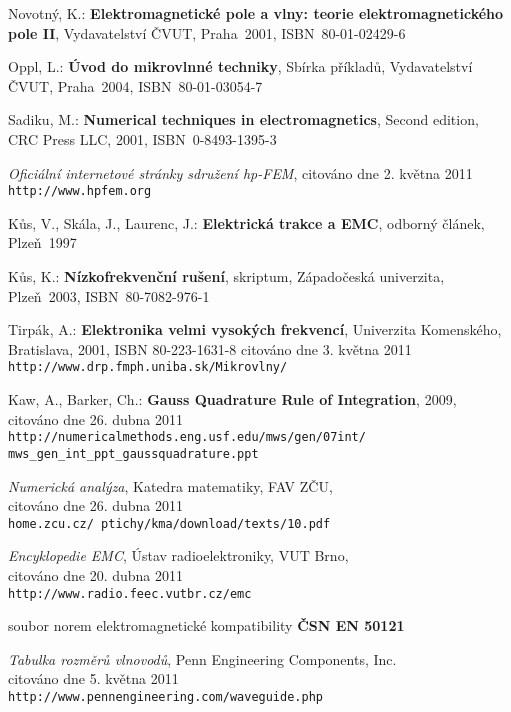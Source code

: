 
%


\begin{thebibliography}{9}
{\sc Novotný, K.:}  {\bf Elektromagnetické pole a vlny: teorie elektromagnetického pole II},
Vydavatelství ČVUT, Praha~2001, \mbox{ISBN 80-01-02429-6}

{\sc Oppl, L.:}  {\bf Úvod do mikrovlnné techniky},
Sbírka příkladů, Vydavatelství ČVUT, Praha~2004, \mbox{ISBN 80-01-03054-7}

{\sc Sadiku, M.:} {\bf Numerical techniques in electromagnetics},
Second edition, CRC Press LLC, 2001, \mbox{ISBN 0-8493-1395-3}

{\em Oficiální internetové stránky sdružení hp-FEM},
citováno dne 2. května 2011 \\
\texttt{http://www.hpfem.org}

{\sc Kůs, V., Skála, J., Laurenc, J.:}  {\bf Elektrická trakce a EMC},
odborný článek, Plzeň~1997

{\sc Kůs, K.:}  {\bf Nízkofrekvenční rušení},
skriptum, Západočeská univerzita, Plzeň~2003, \mbox{ISBN 80-7082-976-1}

{\sc Tirpák, A.:}  {\bf Elektronika velmi vysokých frekvencí}, Univerzita Komenského, Bratislava, 2001, ISBN 80-223-1631-8
citováno dne 3. května 2011 \\
\texttt{http://www.drp.fmph.uniba.sk/Mikrovlny/}

{\sc Kaw, A., Barker, Ch.:} {\bf Gauss Quadrature Rule of Integration}, 2009, \\
citováno dne 26. dubna 2011 \\
\texttt{http://numericalmethods.eng.usf.edu/mws/gen/07int/\\mws\_gen\_int\_ppt\_gaussquadrature.ppt}

{\em Numerická analýza}, Katedra matematiky, FAV ZČU,\\
citováno dne 26. dubna 2011 \\
\texttt{home.zcu.cz/~ptichy/kma/download/texts/10.pdf}

{\em Encyklopedie EMC}, Ústav radioelektroniky, VUT Brno,\\
citováno dne 20. dubna 2011 \\
\texttt{http://www.radio.feec.vutbr.cz/emc}

soubor norem elektromagnetické kompatibility  {\bf ČSN EN 50121}

{\em Tabulka rozměrů vlnovodů}, Penn Engineering Components, Inc.\\
citováno dne 5. května 2011 \\
\texttt{http://www.pennengineering.com/waveguide.php}


\end{thebibliography}

